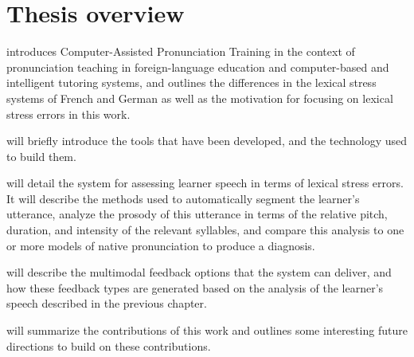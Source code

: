 \section{Thesis overview}
\label{sec:intro:overview}

 introduces Computer-Assisted Pronunciation Training in the context of pronunciation teaching in foreign-language education and computer-based and intelligent tutoring systems, and outlines the differences in the lexical stress systems of French and German as well as the motivation for focusing on lexical stress errors in this work.


 will briefly introduce the tools that have been developed, and the technology used to build them.

 will detail the system for assessing learner speech in terms of lexical stress errors. It will describe the methods used to automatically segment the learner's utterance, analyze the prosody of this utterance in terms of the relative pitch, duration, and intensity of the relevant syllables, and compare this analysis to one or more models of native pronunciation to produce a diagnosis.

 will describe the multimodal feedback options that the system can deliver, and how these feedback types are generated based on the analysis of the learner's speech described in the previous chapter. 

 will summarize the contributions of this work and outlines some interesting future directions to build on these contributions.




